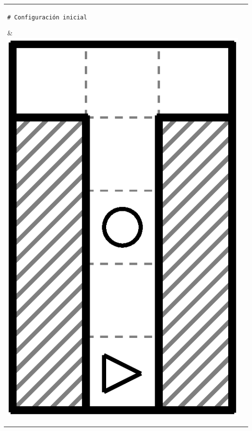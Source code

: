 \documentclass{oci}
\newcommand*{\tabbox}[2][t]{\vspace{0pt}\parbox[#1][2.3\baselineskip]{20em}{\strut#2\strut}}
\begin{document}
\begin{problemDescription}
\begin{center}
  \begin{tabular}{|V|V|}
    \hline
    \tabbox{\texttt{\# Configuración inicial}}        &\includegraphics[angle=90, scale=0.25]{laberintos/ejemplo1-1.eps}\\

\end{tabular}
\end{center}
\end{problemDescription}
\end{document}
